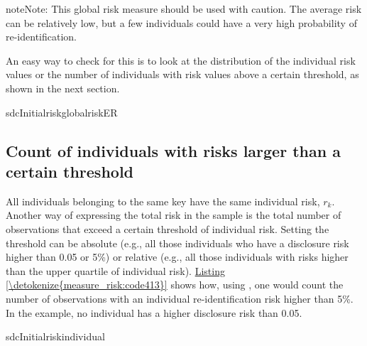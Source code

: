 \documentclass[letterpaper,10pt,english]{sphinxmanual}
\begin{document}
\begin{sphinxadmonition}{note}{Note:}
This global risk measure should be used with
caution. The average risk can be relatively low, but a few individuals
could have a very high probability of re-identification.
\end{sphinxadmonition}

An easy way to check for this is to look at the distribution of the individual risk
values or the number of individuals with risk values above a certain
threshold, as shown in the next section.

\def\sphinxLiteralBlockLabel{\label{\detokenize{measure_risk:code412}}}
%
\begin{sphinxVerbatim}[commandchars=\\\{\},numbers=left,firstnumber=1,stepnumber=1]
 sdcInitialriskglobalrisk\PYGZus{}ER

     \PYG{p}{[}\PYG{p}{]} 
\end{sphinxVerbatim}


\subsection{Count of individuals with risks larger than a certain threshold}
\label{\detokenize{measure_risk:count-of-individuals-with-risks-larger-than-a-certain-threshold}}
All individuals belonging to the same key have the same individual risk,
\(r_{k}\). Another way of expressing the total risk in the sample is
the total number of observations that exceed a certain threshold of
individual risk. Setting the threshold can be absolute (e.g., all those
individuals who have a disclosure risk higher than 0.05 or 5\%) or
relative (e.g., all those individuals with risks higher than the upper
quartile of individual risk). \hyperref[\detokenize{measure_risk:code413}]{Listing \ref{\detokenize{measure_risk:code413}}} shows how, using , one
would count the number of observations with an individual
re-identification risk higher than 5\%. In the example, no individual has
a higher disclosure risk than 0.05.

\def\sphinxLiteralBlockLabel{\label{\detokenize{measure_risk:code413}}}
%
\begin{sphinxVerbatim}[commandchars=\\\{\},numbers=left,firstnumber=1,stepnumber=1]
 sdcInitialriskindividual\PYG{p}{[}\PYG{p}{]}  

     \PYG{p}{[}\PYG{p}{]} 
\end{sphinxVerbatim}
\end{document}
